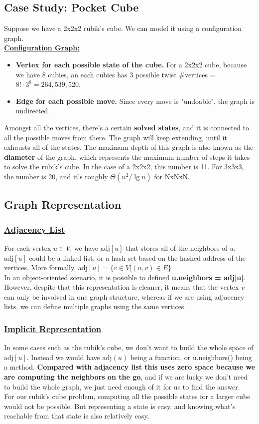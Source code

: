 \documentclass[a4paper]{article}
\renewcommand{\sb}{\vspace*{4px} \\}
\begin{document}
\subsection{Case Study: Pocket Cube}
Suppose we have a 2x2x2 rubik's cube. We can model it using a configuration graph.\sb
\textbf{\underline{Configuration Graph:}} \begin{itemize}
    \item \textbf{Vertex for each possible state of the cube.} For a 2x2x2 cube, 
    because we have 8 cubies, an each cubies has 3 possible twist 
    \#vertices = $8! \cdot 3^8 = 264,539,520$.
    \item \textbf{Edge for each possible move.} Since every move is "undoable", 
    the graph is undirected.
\end{itemize}
Amongst all the vertices, there's a certain \textbf{solved states}, and it is connected 
to all the possible moves from there. The graph will keep extending, until it 
exhausts all of the states. The maximum depth of this graph is also known as 
the \textbf{diameter} of the graph, which represents the maximum number of steps 
it takes to solve the rubik's cube. In the case of a 2x2x2, this number is 11. 
For 3x3x3, the number is 20, and it's roughly $\Theta(n^2 / \lg n)$ for NxNxN.

\subsection{Graph Representation}

\subsubsection*{\underline{Adjacency List}} For each vertex $u \in V$, we have 
$\text{adj}[u]$ that stores all of the neighbors of $u$. $\text{adj}[u]$ could 
be a linked list, or a hash set based on the hashed address of the vertices. 
More formally, $\text{adj}[u] = \{ v \in V | (u, v) \in E \}$ \sb
In an object-oriented scenario, it is possible to defined \textbf{u.neighbors = adj[u]}. 
However, despite that this representation is cleaner, 
it means that the vertex $v$ can only be involved in one graph structure, whereas 
if we are using adjacency lists, we can define multiple graphs using the same 
vertices.

\subsubsection*{\underline{Implicit Representation}} In some cases such as the 
rubik's cube, we don't want to build the whole space of $\text{adj}[u]$. Instead 
we would have $\text{adj}(u)$ being a function, or u.neighbors() being a method. 
\textbf{Compared with adjacency list this uses zero space because we are computing the 
neighbors on the go}, and if we are lucky we don't need to build the whole graph, 
we just need enough of it for us to find the answer. \sb
For our rubik's cube problem, computing all the possible states for a larger cube 
would not be possible. But representing a state is easy, and knowing what's 
reachable from that state is also relatively easy. 
\end{document}
